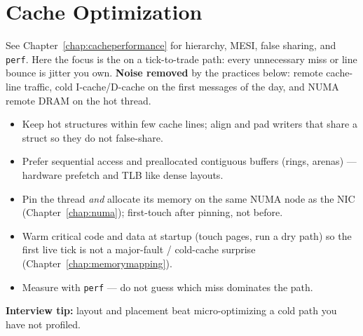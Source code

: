 \section{Cache Optimization}
\label{sec:lowlatency-cache-optimization}
See Chapter~\ref{chap:cacheperformance} for hierarchy, MESI, false sharing, and 
\texttt{perf}. Here the focus is the  on a tick-to-trade path: 
every unnecessary miss or line bounce is jitter you own.
\newline
\textbf{Noise removed} by the practices below: remote cache-line traffic, cold I-cache/D-cache 
on the first messages of the day, and NUMA remote DRAM on the hot thread.
\begin{itemize}
    \item Keep hot structures within few cache lines; align and pad writers that share a 
          struct so they do not false-share.
    \item Prefer sequential access and preallocated contiguous buffers (rings, arenas) --- 
          hardware prefetch and TLB like dense layouts.
    \item Pin the thread \emph{and} allocate its memory on the same NUMA node as the NIC 
          (Chapter~\ref{chap:numa}); first-touch after pinning, not before.
    \item Warm critical code and data at startup (touch pages, run a dry path) so the first 
          live tick is not a major-fault / cold-cache surprise 
          (Chapter~\ref{chap:memorymapping}).
    \item Measure with \texttt{perf} --- do not guess which miss dominates the path.
\end{itemize}
\par\noindent\textbf{Interview tip:} layout and placement beat micro-optimizing a cold path 
you have not profiled.

